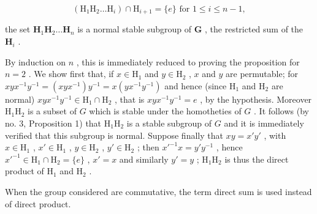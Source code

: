 \[
\left(\mathrm{H} _ {1} \mathrm{H} _ {2} \dots \mathrm{H} _ {i}\right) \cap \mathrm{H} _ {i + 1} = \{e \} \text { for } 1 \leqslant i \leqslant n - 1,
\]

the set \(\mathbf{H}_1\mathbf{H}_2\ldots \mathbf{H}_n\) is a normal stable subgroup of \(\mathbf{G}\) , the restricted sum of the \(\mathbf{H}_i\) .

By induction on \(n\) , this is immediately reduced to proving the proposition for \(n = 2\) . We show first that, if \(x \in \mathrm{H}_1\) and \(y \in \mathrm{H}_2\) , \(x\) and \(y\) are permutable; for \(xyx^{-1}y^{-1} = (xyx^{-1})y^{-1} = x(yx^{-1}y^{-1})\) and hence (since \(\mathrm{H}_1\) and \(\mathrm{H}_2\) are normal) \(xyx^{-1}y^{-1} \in \mathrm{H}_1 \cap \mathrm{H}_2\) , that is \(xyx^{-1}y^{-1} = e\) , by the hypothesis. Moreover \(\mathrm{H}_1\mathrm{H}_2\) is a subset of \(G\) which is stable under the homotheties of \(G\) . It follows (by no. 3, Proposition 1) that \(\mathrm{H}_1\mathrm{H}_2\) is a stable subgroup of \(G\) and it is immediately verified that this subgroup is normal. Suppose finally that \(xy = x'y'\) , with \(x \in \mathrm{H}_1\) , \(x' \in \mathrm{H}_1\) , \(y \in \mathrm{H}_2\) , \(y' \in \mathrm{H}_2\) ; then \(x'^{-1}x = y'y^{-1}\) , hence \(x'^{-1} \in \mathrm{H}_1 \cap \mathrm{H}_2 = \{e\}\) , \(x' = x\) and similarly \(y' = y\) ; \(\mathrm{H}_1\mathrm{H}_2\) is thus the direct product of \(\mathrm{H}_1\) and \(\mathrm{H}_2\) .

When the group considered are commutative, the term direct sum is used instead of direct product.

